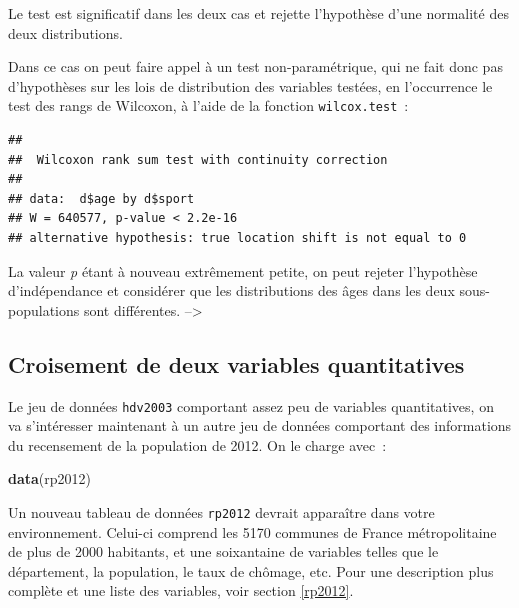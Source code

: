 \documentclass[12pt,]{book}
\newenvironment{Shaded}{\begin{snugshade}}{\end{snugshade}}
\newcommand{\KeywordTok}[1]{\textcolor[rgb]{0.27,0.27,0.27}{\textbf{#1}}}
\newcommand{\NormalTok}[1]{#1}
\newcommand{\OperatorTok}[1]{\textcolor[rgb]{0.43,0.43,0.43}{\textbf{#1}}}
\newcommand{\StringTok}[1]{\textcolor[rgb]{0.5,0.5,0.5}{#1}}
\begin{document}
Le test est significatif dans les deux cas et rejette l'hypothèse d'une normalité des deux distributions.

Dans ce cas on peut faire appel à un test non-paramétrique, qui ne fait donc pas d'hypothèses sur les lois de distribution des variables testées, en l'occurrence le test des rangs de Wilcoxon, à l'aide de la fonction \texttt{wilcox.test}~:

\begin{Shaded}
\end{Shaded}

\begin{verbatim}
## 
## 	Wilcoxon rank sum test with continuity correction
## 
## data:  d$age by d$sport
## W = 640577, p-value < 2.2e-16
## alternative hypothesis: true location shift is not equal to 0
\end{verbatim}

La valeur \emph{p} étant à nouveau extrêmement petite, on peut rejeter l'hypothèse d'indépendance et considérer que les distributions des âges dans les deux sous-populations sont différentes.
--\textgreater{}

\hypertarget{croisement-de-deux-variables-quantitatives}{%
\subsection{Croisement de deux variables quantitatives}\label{croisement-de-deux-variables-quantitatives}}

Le jeu de données \texttt{hdv2003} comportant assez peu de variables quantitatives, on va s'intéresser maintenant à un autre jeu de données comportant des informations du recensement de la population de 2012. On le charge avec~:

\begin{Shaded}
\begin{Highlighting}[]
\KeywordTok{data}\NormalTok{(rp2012)}
\end{Highlighting}
\end{Shaded}

Un nouveau tableau de données \texttt{rp2012} devrait apparaître dans votre environnement. Celui-ci comprend les 5170 communes de France métropolitaine de plus de 2000 habitants, et une soixantaine de variables telles que le département, la population, le taux de chômage, etc. Pour une description plus complète et une liste des variables, voir section \ref{rp2012}.
\end{document}
